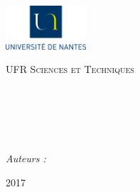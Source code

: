 \begin{titlepage}

\begin{center}

\begin{minipage}[t]{0.48\textwidth}
  \begin{flushleft}
    \includegraphics [width=30mm]{images/logo-univ.png} \\[0.5cm]
    \begin{spacing}{1.5}
      \textsc{\LARGE UFR Sciences et Techniques}
    \end{spacing}
  \end{flushleft}
\end{minipage}
\textsc{\Large \reportsubject}\\[0.5cm]
\HRule \\[0.4cm]
{\huge \bfseries \reporttitle}\\[0.4cm]
\HRule \\[1.5cm]

\begin{minipage}[t]{0.4\textwidth}
  \begin{flushleft} \large
    \emph{Auteurs :}\\
    
    
    
    
    \reportauthor
  \end{flushleft}
\end{minipage}

\vfill

{\large 2017}

\end{center}

\end{titlepage}

